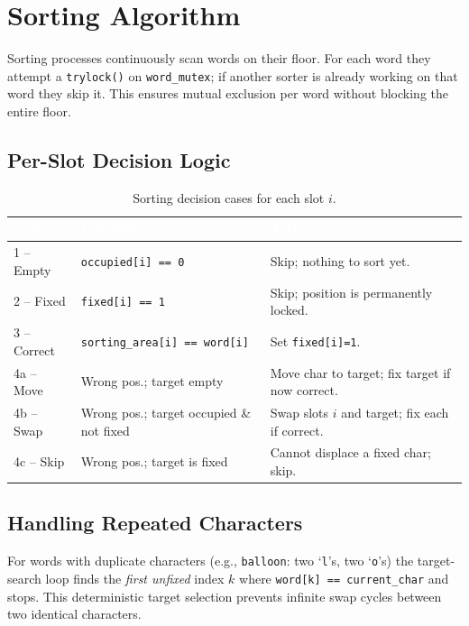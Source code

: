\documentclass[12pt,a4paper]{article}
\newcommand{\code}[1]{\texttt{\small #1}}
\begin{document}
\section{Sorting Algorithm}

Sorting processes continuously scan words on their floor. For each word they
attempt a \code{trylock()} on \code{word\_mutex}; if another sorter is already
working on that word they skip it. This ensures mutual exclusion per word without
blocking the entire floor.

\subsection{Per-Slot Decision Logic}

\begin{table}[h!]
\centering
\caption{Sorting decision cases for each slot $i$.}
\begin{tabularx}{\textwidth}{l l X}
\toprule
\rowcolor{darkblue}
\textcolor{white}{\textbf{Case}} &
\textcolor{white}{\textbf{Condition}} &
\textcolor{white}{\textbf{Action}} \\
\midrule
1 -- Empty   & \texttt{occupied[i] == 0} & Skip; nothing to sort yet. \\
\rowcolor{rowgray}
2 -- Fixed   & \texttt{fixed[i] == 1}    & Skip; position is permanently locked. \\
3 -- Correct & \texttt{sorting\_area[i] == word[i]} & Set \texttt{fixed[i]=1}. \\
\rowcolor{rowgray}
4a -- Move   & Wrong pos.; target empty  & Move char to target; fix target if now correct. \\
4b -- Swap   & Wrong pos.; target occupied \& not fixed & Swap slots $i$ and target; fix each if correct. \\
\rowcolor{rowgray}
4c -- Skip   & Wrong pos.; target is fixed & Cannot displace a fixed char; skip. \\
\bottomrule
\end{tabularx}
\end{table}

\subsection{Handling Repeated Characters}

For words with duplicate characters (e.g., \texttt{balloon}: two `\texttt{l}'s,
two `\texttt{o}'s) the target-search loop finds the \emph{first unfixed} index $k$
where \code{word[k] == current\_char} and stops. This deterministic target
selection prevents infinite swap cycles between two identical characters.
\end{document}
